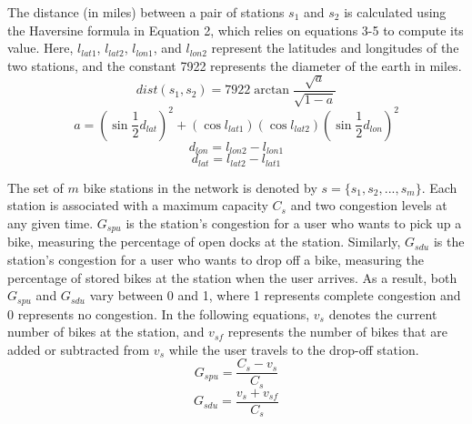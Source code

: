 \documentclass[times, 10pt,twocolumn]{article}
\begin{document}
The distance (in miles) between a pair of stations $s_1$ and $s_2$ is calculated using the Haversine formula in Equation 2, which relies on equations 3-5 to compute its value. Here, $l_{lat1}$, $l_{lat2}$, $l_{lon1}$, and $l_{lon2}$ represent the latitudes and longitudes of the two stations, and the constant 7922 represents the diameter of the earth in miles.
\begin{equation}
dist(s_1,s_2) = 7922\arctan{\frac{\sqrt{a}}{\sqrt{1-a}}}
\end{equation}
\begin{equation}
a = (\sin{\frac{1}{2}d_{lat}})^2+(\cos{l_{lat1}})(\cos{l_{lat2}})(\sin{\frac{1}{2}d_{lon}})^2
\end{equation}
\begin{equation}
d_{lon} = l_{lon2} - l_{lon1}
\end{equation}
\begin{equation}
d_{lat} = l_{lat2} - l_{lat1}
\end{equation}

The set of $m$ bike stations in the network is denoted by $s = \{s_1, s_2, ..., s_m\}$. Each station is associated with a maximum capacity $C_s$ and two congestion levels at any given time. $G_{spu}$ is the station's congestion for a user who wants to pick up a bike, measuring the percentage of open docks at the station. Similarly, $G_{sdu}$ is the station's congestion for a user who wants to drop off a bike, measuring the percentage of stored bikes at the station when the user arrives. As a result, both $G_{spu}$ and $G_{sdu}$ vary between 0 and 1, where 1 represents complete congestion and 0 represents no congestion. In the following equations, $v_s$ denotes the current number of bikes at the station, and $v_{sf}$ represents the number of bikes that are added or subtracted from $v_s$ while the user travels to the drop-off station.
\begin{equation}
G_{spu} = \frac{C_s-v_s}{C_s}
\end{equation}
\begin{equation}
G_{sdu} = \frac{v_s+v_{sf}}{C_s}
\end{equation}
\end{document}
